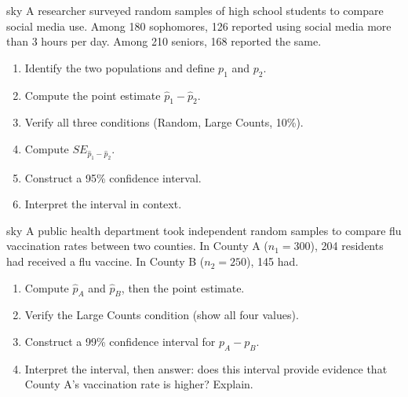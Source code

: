 \documentclass[10pt]{article}
\begin{document}
\namepartnerperiod

\vspace{0.15in}

\begin{scenariobox}{sky}
A researcher surveyed random samples of high school students to compare social media use.
Among 180 sophomores, 126 reported using social media more than 3 hours per day.
Among 210 seniors, 168 reported the same.

\begin{enumerate}[label=\arabic*.]
  \item Identify the two populations and define $p_1$ and $p_2$.
        \writeline

  \item Compute the point estimate $\hat p_1 - \hat p_2$.
        \writeline

  \item Verify all three conditions (Random, Large Counts, 10\%).

  \item Compute $SE_{\hat p_1 - \hat p_2}$.

  \item Construct a 95\% confidence interval.

  \item Interpret the interval in context.
\end{enumerate}
\end{scenariobox}

\begin{scenariobox}{sky}
A public health department took independent random samples to compare flu vaccination rates
between two counties. In County A ($n_1 = 300$), 204 residents had received a flu vaccine.
In County B ($n_2 = 250$), 145 had.

\begin{enumerate}[label=\arabic*.]
  \item Compute $\hat p_A$ and $\hat p_B$, then the point estimate.
        \writeline

  \item Verify the Large Counts condition (show all four values).

  \item Construct a 99\% confidence interval for $p_A - p_B$.

  \item Interpret the interval, then answer: does this interval provide evidence that County A's
        vaccination rate is higher? Explain.
\end{enumerate}
\end{scenariobox}
\end{document}
